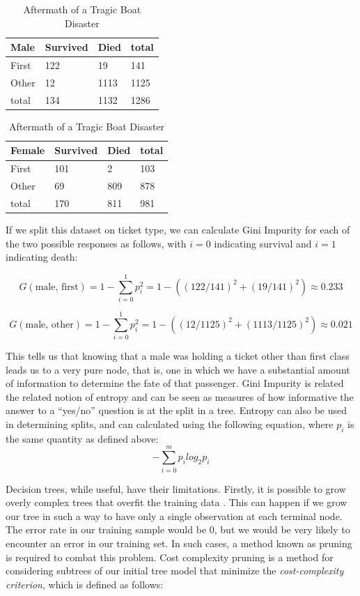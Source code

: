 \documentclass[preprint,12pt]{elsarticle}
\begin{document}
\begin{table}[h]
\begin{tabular}{|l | l l | l|}
\hline
 Male & Survived & Died & total\\
\hline
First & 122 & 19 & 141 \\
Other & 12 & 1113 & 1125 \\
\hline
total & 134 & 1132 & 1286 \\
\hline
\end{tabular}
\quad
\begin{tabular}{|l | l l | l|}
\hline
Female & Survived & Died & total\\
\hline
First & 101 & 2 & 103 \\
Other & 69 & 809 & 878 \\
\hline
total & 170 & 811 & 981 \\
\hline
\end{tabular}

\caption{Aftermath of a Tragic Boat Disaster}
\end{table}

\noindent If we split this dataset on ticket type, we can calculate Gini Impurity for each of the two possible responses as follows, with $i=0$ indicating survival and $i=1$ indicating death:

$$G(\textrm{male, first}) = 1 - \sum\limits_{i=0}^1 p_{i}^{2} = 1 - ((122/141)^{2}+(19/141)^{2}) \approx 0.233 $$

$$G(\textrm{male, other}) = 1 - \sum\limits_{i=0}^1 p_{i}^{2} = 1 - ((12/1125)^{2}+(1113/1125)^{2}) \approx 0.021 $$

\noindent This tells us that knowing that a male was holding a ticket other than first class leads us to a very pure node, that is, one in which we have a substantial amount of information to determine the fate of that passenger. Gini Impurity is related the related notion of entropy and can be seen as measures of how informative the answer to a ``yes/no'' question is at the split in a tree. Entropy can also be used in determining splits, and can calculated using the following equation, where $p_{i}$ is the same quantity as defined above: 
$$-\sum\limits_{i=0}^m p_{i}log_{2}p_{i}$$

Decision trees, while useful, have their limitations. Firstly, it is possible to grow overly complex trees that overfit the training data \cite{ISLR}. This can happen if we grow our tree in such a way to have only a single observation at each terminal node. The error rate in our training sample would be $0$, but we would be very likely to encounter an error in our training set. In such cases, a method known as pruning is required to combat this problem. Cost complexity pruning is a method for considering subtrees of our initial tree model that minimize the \textit{cost-complexity criterion}, which is defined as follows\cite{ESL}:
\end{document}
